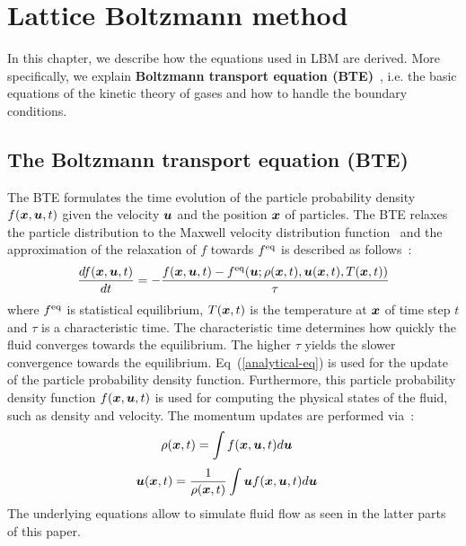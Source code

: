 \chapter{Lattice Boltzmann method}
\vspace{-8mm}
In this chapter, we describe how the equations used in LBM
are derived.
More specifically, we explain
{\bf Boltzmann transport equation (BTE)}~\cite{mcnamara1988use}, i.e.
the basic equations of the kinetic theory of gases and
how to handle the boundary conditions.

\section{The Boltzmann transport equation (BTE)}
The BTE formulates the time evolution of the 
particle probability density $f(\boldsymbol{x}, \boldsymbol{u}, t)$ given
the velocity $\boldsymbol{u}$ and the position $\boldsymbol{x}$ of particles.
The BTE relaxes the particle distribution to
the Maxwell velocity distribution
function~\cite{huang1963statistical} and the approximation of the relaxation of
$f$ towards $f^{\rm eq}$ is described as follows~\cite{bhatnagar1954model}:
\begin{equation}
  \begin{aligned}
    \frac{d f(\boldsymbol{x}, \boldsymbol{u}, t)}{d t} &= 
    - \frac{
      f(\boldsymbol{x}, \boldsymbol{u}, t) - f^{\rm eq}(\boldsymbol{u}; \rho(\boldsymbol{x}, t), \boldsymbol{u}(\boldsymbol{x}, t), T(\boldsymbol{x}, t))
      }{\tau} \\
    \end{aligned}
    \label{analytical-eq}
  \end{equation}
where $f^{\rm eq}$ is statistical equilibrium,
$T(\boldsymbol{x}, t)$ is the temperature at $\boldsymbol{x}$
of time step $t$ and
$\tau$ is a characteristic time.
The characteristic time determines how quickly
the fluid converges towards the equilibrium.
The higher $\tau$ yields the slower 
convergence towards the equilibrium.
Eq~(\ref{analytical-eq}) is used for the update 
of the particle probability density function.
Furthermore, this particle probability density function
$f(\boldsymbol{x}, \boldsymbol{u}, t)$ is used for computing
the physical states of the fluid,
such as density and velocity.
The momentum updates are performed via~\cite{caroli1984non}:
\begin{equation}
  \begin{aligned}
    \rho(\boldsymbol{x}, t) &= \int f(\boldsymbol{x}, \boldsymbol{u}, t) d\boldsymbol{u} 
  \end{aligned}
  \label{density-analytical-update}
\end{equation}
\begin{equation}
\begin{aligned}
  \boldsymbol{u}(\boldsymbol{x}, t) &= \frac{1}{\rho(\boldsymbol{x}, t)} \int \boldsymbol{u} f(\boldsymbol{x}, \boldsymbol{u}, t)  d\boldsymbol{u}
\end{aligned}
\label{velocity-analytical-update}
\end{equation}
The underlying equations allow to simulate
fluid flow as seen in the latter parts of this paper.

